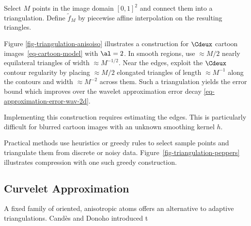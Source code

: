 Select $M$ points in the image domain $[0,1]^2$ and connect them into a triangulation. Define $\tilde f_M$ by piecewise affine interpolation on the resulting triangles.


Figure \ref{fig-triangulation-anisoiso} illustrates a construction for $\Cdeux$ cartoon images~\eqref{eq-cartoon-model} with $\al=2$. In smooth regions, use $\approx M/2$ nearly equilateral triangles of width $\approx M^{-1/2}$. Near the edges, exploit the $\Cdeux$ contour regularity by placing $\approx M/2$ elongated triangles of length $\approx M^{-1}$ along the contours and width $\approx M^{-2}$ across them. Such a triangulation yields the error bound
which improves over the wavelet approximation error decay \eqref{eq-approximation-error-wav-2d}. 

Implementing this construction requires estimating the edges. This is particularly difficult for blurred cartoon images with an unknown smoothing kernel $h$.

Practical methods use heuristics or greedy rules to select sample points and triangulate them from discrete or noisy data.
Figure~\ref{fig-triangulation-peppers} illustrates compression with one such greedy construction.


                                        
\subsection{Curvelet Approximation}

A fixed family of oriented, anisotropic atoms offers an alternative to adaptive triangulations. Cand\`es and Donoho introduced t
